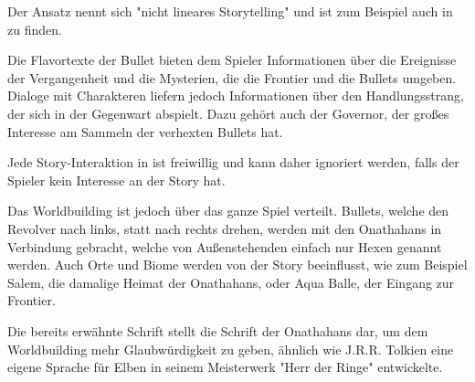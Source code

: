 Der Ansatz nennt sich "nicht lineares Storytelling" und ist zum Beispiel auch in  zu finden.


Die Flavortexte der Bullet bieten dem Spieler Informationen über die Ereignisse der Vergangenheit und die Mysterien,
die die Frontier und die Bullets umgeben. Dialoge mit Charakteren liefern jedoch Informationen über den Handlungsstrang,
der sich in der Gegenwart abspielt. Dazu gehört auch \zB der Governor, der großes Interesse am Sammeln der verhexten Bullets hat.




Jede Story-Interaktion in \FF ist freiwillig und kann daher ignoriert werden, falls der Spieler kein Interesse an der Story hat.


Das Worldbuilding ist jedoch über das ganze Spiel verteilt. Bullets, welche den Revolver nach links, statt nach rechts drehen,
werden mit den Onathahans in Verbindung gebracht, welche von Außenstehenden einfach nur Hexen genannt werden.
Auch Orte und Biome werden von der Story beeinflusst, wie zum Beispiel Salem, die damalige Heimat der Onathahans, oder Aqua Balle,
der Eingang zur Frontier.


Die bereits erwähnte Schrift stellt die Schrift der Onathahans dar, um dem Worldbuilding mehr Glaubwürdigkeit zu geben,
ähnlich wie J.R.R. Tolkien eine eigene Sprache für Elben in seinem Meisterwerk "Herr der Ringe" entwickelte. 

\renewcommand{\kapitelautor}{}
